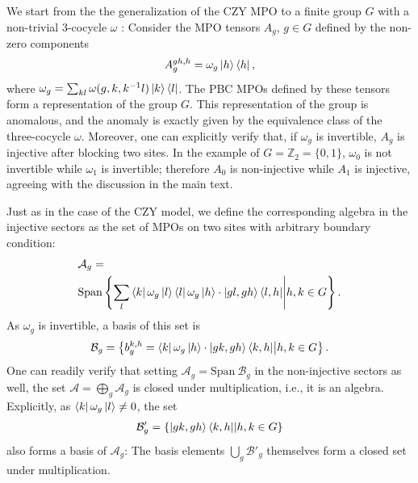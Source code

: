 \documentclass[prx, twocolumn, superscriptaddress, dvipsnames]{revtex4-2}
\theoremstyle{definition}
\newcommand{\mA}{\mathcal{A}}
\begin{document}
We start from the the generalization of the CZY MPO to a finite group $G$ with a non-trivial 3-cocycle $\omega$ \cite{garrerubio2023classifying}: Consider the MPO tensors $A_g$, $g\in G$ defined by the non-zero components
\begin{equation}
    A_g^{gh,h} = \omega_g\ket{h}\bra{h},
\end{equation}
where $\omega_g = \sum_{kl} \omega(g,k,k^{-1}l) \ket{k}\bra{l}$. The PBC MPOs defined by these tensors form a representation of the group $G$. This representation of the group is anomalous, and the anomaly is exactly given by the equivalence class of the three-cocycle $\omega$. Moreover, one can explicitly verify that,  if $\omega_g$ is invertible, $A_g$ is injective after blocking two sites. In the example of $G=\mathbb{Z}_2=\{0,1\}$, $\omega_0$ is not invertible while $\omega_1$ is invertible; therefore $A_0$ is non-injective while $A_1$ is injective, agreeing with the discussion in the main text.  

Just as in the case of the CZY model, we define the corresponding algebra in the injective sectors as the set of MPOs on two sites with arbitrary boundary condition:
\begin{equation}\label{eq:G algebra def wrong}
    \begin{aligned}
    &\mathcal{A}_g = \\&\mathrm{Span}\left\{\sum_{l} \bra{k}\omega_g \ket{l} \bra{l} \omega_g \ket{h} \cdot \ket{gl,gh}\bra{l,h} \middle| h,k\in G \right\}.        
    \end{aligned}
\end{equation}
As $\omega_g$ is invertible, a basis of this set is 
\begin{equation}\label{eq:G algebra def right}
    \mathcal{B}_g = \left\{ b_g^{k,h} =\bra{k} \omega_g \ket{h} \cdot \ket{gk,gh}\bra{k,h} \middle| h,k\in G \right\}.
\end{equation}
One can readily verify that setting $\mathcal{A}_g = \mathrm{Span}\  \mathcal{B}_g$ in the non-injective sectors as well, the set $\mA = \bigoplus_g \mathcal{A}_g$ is closed under multiplication, i.e., it is an algebra. Explicitly, as $\bra{k}\omega_g\ket{l} \neq 0$, the set
\begin{equation}\label{eq:G algebra def right 2}
    \mathcal{B}'_g = \left\{  \ket{gk,gh}\bra{k,h} \middle| h,k\in G \right\}
\end{equation}
also forms a basis of $\mathcal{A}_g$: The basis elements $\bigcup_g \mathcal{B}'_g$ themselves form a closed set under multiplication. 
\end{document}
